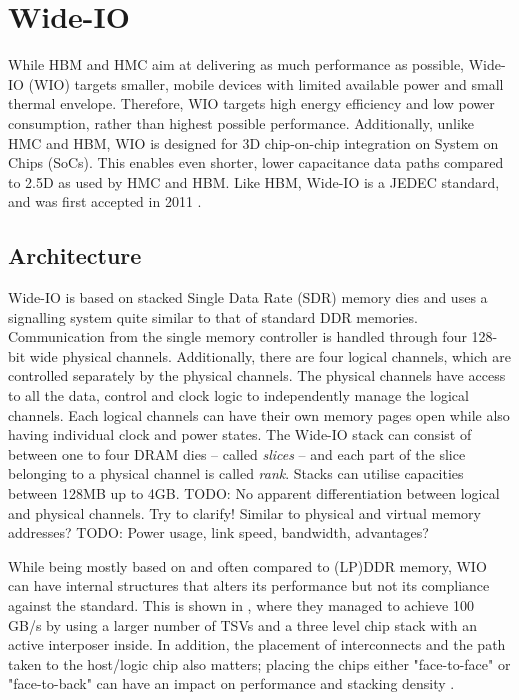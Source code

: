 \section{Wide-IO}
While HBM and HMC aim at delivering as much performance as possible, Wide-IO (WIO) targets smaller, mobile devices with limited available power and small thermal envelope. Therefore, WIO targets high energy efficiency and low power consumption, rather than highest possible performance. Additionally, unlike HMC and HBM, WIO is designed for 3D chip-on-chip integration on System on Chips (SoCs). This enables even shorter, lower capacitance data paths compared to 2.5D as used by HMC and HBM. Like HBM, Wide-IO is a JEDEC standard, and was first accepted in 2011 \cite{standard2011wide}. 

\subsection{Architecture}
Wide-IO is based on stacked Single Data Rate (SDR) memory dies and uses a signalling system quite similar to that of standard DDR memories. Communication from the single memory controller is handled through four 128-bit wide physical channels. Additionally, there are four logical channels, which are controlled separately by the physical channels. The physical channels have access to all the data, control and clock logic to independently manage the logical channels. Each logical channels can have their own memory pages open while also having individual clock and power states. The Wide-IO stack can consist of between one to four DRAM dies -- called \emph{slices} -- and each part of the slice belonging to a physical channel is called \emph{rank}. Stacks can utilise capacities between 128MB up to 4GB. TODO: No apparent differentiation between logical and physical channels. Try to clarify! Similar to physical and virtual memory addresses? 
TODO: Power usage, link speed, bandwidth, advantages?
\bigskip

While being mostly based on and often compared to (LP)DDR memory, WIO can have internal structures that alters its performance but not its compliance against the standard. This is shown in \cite{6487803}, where they managed to achieve 100 GB/s by using a larger number of TSVs and a three level chip stack with an active interposer inside. In addition, the placement of interconnects and the path taken to the host/logic chip also matters; placing the chips either "face-to-face" or "face-to-back" can have an impact on performance and stacking density \cite{6248798}.

